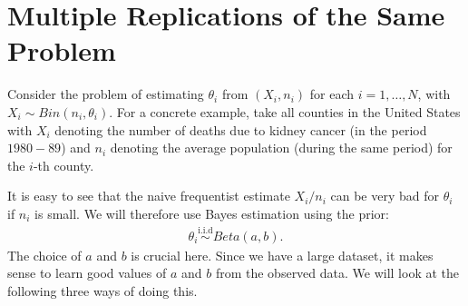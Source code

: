 \documentclass{scrartcl}
\begin{document}
\section{Multiple Replications of the Same Problem}
Consider the problem of estimating $\theta_i$ from
$(X_i, n_i)$ for each $i = 1, \dots, N$, with $X_i \sim Bin(n_i,
\theta_i)$. For a concrete example, take all counties in the United
States with $X_i$ denoting the number of deaths
due to kidney cancer (in the period $1980-89$) and $n_i$ denoting the
average population (during the same period) for the $i$-th county.

It is easy to see that the naive frequentist estimate $X_i/n_i$ can be
very bad for $\theta_i$ if $n_i$ is small. We will therefore use
Bayes estimation using the prior:
\begin{align*}
  \theta_i \overset{\text{i.i.d}}{\sim} Beta(a, b). 
\end{align*}
The choice of $a$ and $b$ is crucial here. Since we have a large
dataset, it makes sense to learn good values of $a$ and $b$ from the
observed data. We will look at the following three ways of doing
this.
\end{document}
